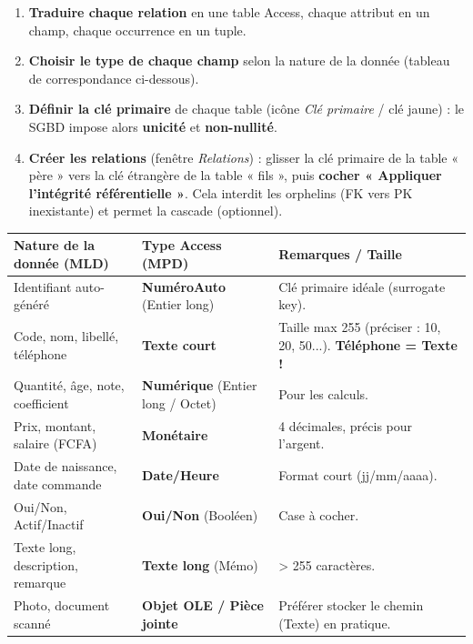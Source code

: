 \documentclass[11pt]{article}
\newcommand{\cle}[1]{{\popxbold\color{popdark}#1}}
\begin{document}
\begin{methode}
\begin{enumerate}
\item \textbf{Traduire chaque relation} en une \cle{table} Access, chaque attribut en un \cle{champ}, chaque occurrence en un \cle{tuple}.
\item \textbf{Choisir le type de chaque champ} selon la nature de la donnée (tableau de correspondance ci-dessous).
\item \textbf{Définir la clé primaire} de chaque table (icône \emph{Clé primaire} / clé jaune) : le SGBD impose alors \textbf{unicité} et \textbf{non-nullité}.
\item \textbf{Créer les relations} (fenêtre \emph{Relations}) : glisser la clé primaire de la table « père » vers la clé étrangère de la table « fils », puis \textbf{cocher « Appliquer l'intégrité référentielle »}. Cela interdit les orphelins (FK vers PK inexistante) et permet la cascade (optionnel).
\end{enumerate}
\end{methode}

\begin{center}
\begin{tabularx}{\linewidth}{|l|X|l|}
\hline
\rowcolor{popblueL} \textbf{Nature de la donnée (MLD)} & \textbf{Type Access (MPD)} & \textbf{Remarques / Taille} \\
\hline
Identifiant auto-généré & \textbf{NuméroAuto} (Entier long) & Clé primaire idéale (surrogate key). \\
\hline
Code, nom, libellé, téléphone & \textbf{Texte court} & Taille max 255 (préciser : 10, 20, 50...). \textbf{Téléphone = Texte !} \\
\hline
Quantité, âge, note, coefficient & \textbf{Numérique} (Entier long / Octet) & Pour les calculs. \\
\hline
Prix, montant, salaire (FCFA) & \textbf{Monétaire} & 4 décimales, précis pour l'argent. \\
\hline
Date de naissance, date commande & \textbf{Date/Heure} & Format court (jj/mm/aaaa). \\
\hline
Oui/Non, Actif/Inactif & \textbf{Oui/Non} (Booléen) & Case à cocher. \\
\hline
Texte long, description, remarque & \textbf{Texte long} (Mémo) & > 255 caractères. \\
\hline
Photo, document scanné & \textbf{Objet OLE / Pièce jointe} & Préférer stocker le chemin (Texte) en pratique. \\
\hline
\end{tabularx}
\end{center}
\end{document}
